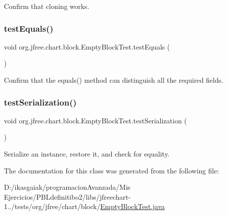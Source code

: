 Confirm that cloning works. \mbox{\label{classorg_1_1jfree_1_1chart_1_1block_1_1_empty_block_test_aff8c78c7e7faf4380c9b6d0d7d1cf764}} 
\subsubsection{\texorpdfstring{test\+Equals()}{testEquals()}}
{\footnotesize\ttfamily void org.\+jfree.\+chart.\+block.\+Empty\+Block\+Test.\+test\+Equals (\begin{DoxyParamCaption}{ }\end{DoxyParamCaption})}

Confirm that the equals() method can distinguish all the required fields. \mbox{\label{classorg_1_1jfree_1_1chart_1_1block_1_1_empty_block_test_a05ba0b905ef7fe8959d3fa0e06e4e55c}} 
\subsubsection{\texorpdfstring{test\+Serialization()}{testSerialization()}}
{\footnotesize\ttfamily void org.\+jfree.\+chart.\+block.\+Empty\+Block\+Test.\+test\+Serialization (\begin{DoxyParamCaption}{ }\end{DoxyParamCaption})}

Serialize an instance, restore it, and check for equality. 

The documentation for this class was generated from the following file\+:\begin{DoxyCompactItemize}
\item 
D\+:/ikasgaiak/programacion\+Avanzada/\+Mis Ejercicios/\+P\+B\+Ldefinitibo2/libs/jfreechart-\/1../tests/org/jfree/chart/block/\mbox{\hyperlink{_empty_block_test_8java}{Empty\+Block\+Test.\+java}}\end{DoxyCompactItemize}
